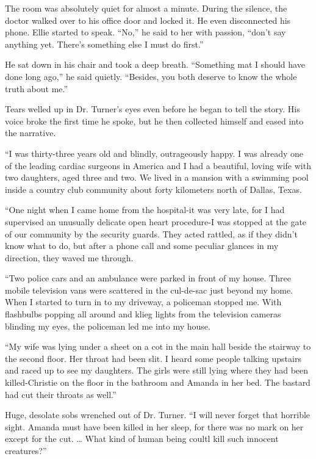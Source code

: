 \documentclass[]{article}
\begin{document}
{The room was absolutely quiet for almost a minute.  During the silence, the doctor walked over to his office door and locked it.  He even disconnected his phone.  Ellie started to speak.  “No,” he said to her with passion, “don’t say anything yet.  There’s something else I must do first.”

He sat down in his chair and took a deep breath.  “Something mat I should have done long ago,” he said quietly.  “Besides, you both deserve to know the whole truth about me.”

Tears welled up in Dr.  Turner’s eyes even before he began to tell the story.  His voice broke the first time he spoke, but he then collected himself and eased into the narrative.

“I was thirty-three years old and blindly, outrageously happy.  I was already one of the leading cardiac surgeons in America and I had a beautiful, loving wife with two daughters, aged three and two.  We lived in a mansion with a swimming pool inside a country club community about forty kilometers north of Dallas, Texas.

“One night when I came home from the hospital-it was very late, for I had supervised an unusually delicate open heart procedure-I was stopped at the gate of our community by the security guards.  They acted rattled, as if they didn’t know what to do, but after a phone call and some peculiar glances in my direction, they waved me through.

“Two police cars and an ambulance were parked in front of my house.  Three mobile television vans were scattered in the cul-de-sac just beyond my home.  When I started to turn in to my driveway, a policeman stopped me.  With flashbulbs popping all around and klieg lights from the television cameras blinding my eyes, the policeman led me into my house.

“My wife was lying under a sheet on a cot in the main hall beside the stairway to the second floor.  Her throat had been slit.  I heard some people talking upstairs and raced up to see my daughters.  The girls were still lying where they had been killed-Christie on the floor in the bathroom and Amanda in her bed.  The bastard had cut their throats as well.”

Huge, desolate sobs wrenched out of Dr.  Turner.  “I will never forget that horrible sight.  Amanda must have been killed in her sleep, for there was no mark on her except for the cut.  … What kind of human being coultl kill such innocent creatures?”

}
\end{document}
